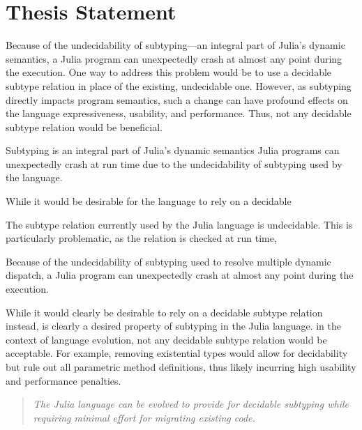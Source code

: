 \chapter{Thesis Statement}\label{chap:3}


Because of the undecidability of subtyping---an integral part of Julia's
dynamic semantics, a Julia program can
unexpectedly crash at almost any point during the execution.
One way to address this problem would be to use a decidable subtype relation
in place of the existing, undecidable one.
However, as subtyping directly impacts program semantics,
such a change can have profound effects on the language expressiveness, 
usability, and performance.
Thus, not any decidable subtype relation would be beneficial.


Subtyping is an integral part of Julia's dynamic semantics
Julia programs can unexpectedly crash at run time due to the undecidability
of subtyping used by the language.

While it would be desirable for the language to rely on a decidable

The subtype relation currently used by the Julia language is undecidable.
This is particularly problematic, as the relation is checked at run time, 


Because of the undecidability of subtyping used to resolve
multiple dynamic dispatch, a Julia program can
unexpectedly crash at almost any point during the execution.

While it would clearly be desirable to rely on a decidable subtype relation
instead, 
is clearly a desired property of subtyping in the Julia language.
in the context of language evolution,
not any decidable subtype relation would be acceptable.
For example, removing existential types would allow for decidability but
rule out all parametric method definitions, thus likely incurring high
usability and performance penalties.

\begin{quotation}\emph{
  The Julia language can be evolved to provide for decidable subtyping while
  requiring minimal effort for migrating existing code.
}\end{quotation}



